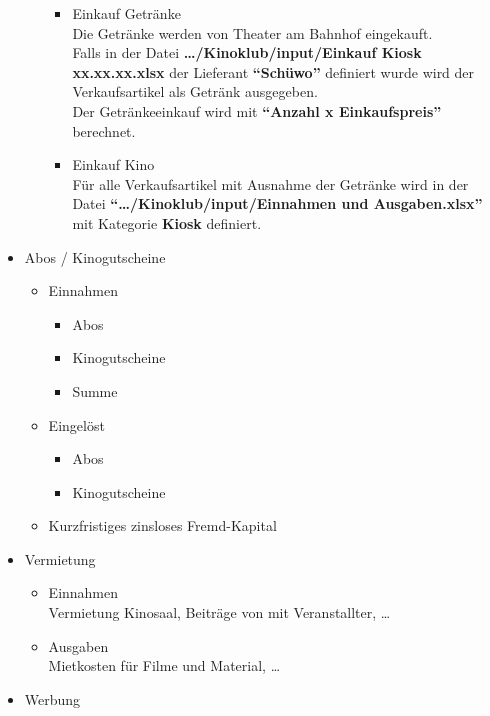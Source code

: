 \documentclass[
]{article}
\providecommand{\tightlist}{%
  \setlength{\itemsep}{0pt}\setlength{\parskip}{0pt}}
\begin{document}
\begin{itemize}
\begin{itemize}
    \begin{itemize}
    \tightlist
    \item
      Einkauf Getränke\\
      Die Getränke werden von Theater am Bahnhof eingekauft.\\
      Falls in der Datei \textbf{\ldots/Kinoklub/input/Einkauf Kiosk
      xx.xx.xx.xlsx} der Lieferant \textbf{``Schüwo''} definiert wurde
      wird der Verkaufsartikel als Getränk ausgegeben.\\
      Der Getränkeeinkauf wird mit \textbf{``Anzahl x Einkaufspreis''}
      berechnet.
    \item
      Einkauf Kino\\
      Für alle Verkaufsartikel mit Ausnahme der Getränke wird in der
      Datei \textbf{``\ldots/Kinoklub/input/Einnahmen und
      Ausgaben.xlsx''} ~ mit Kategorie \textbf{Kiosk} definiert.
    \end{itemize}
  \end{itemize}
\item
  Abos / Kinogutscheine

  \begin{itemize}
  \tightlist
  \item
    Einnahmen

    \begin{itemize}
    \tightlist
    \item
      Abos
    \item
      Kinogutscheine
    \item
      Summe
    \end{itemize}
  \item
    Eingelöst

    \begin{itemize}
    \tightlist
    \item
      Abos
    \item
      Kinogutscheine
    \end{itemize}
  \item
    Kurzfristiges zinsloses Fremd-Kapital
  \end{itemize}
\item
  Vermietung

  \begin{itemize}
  \tightlist
  \item
    Einnahmen\\
    Vermietung Kinosaal, Beiträge von mit Veranstallter, \ldots{}
  \item
    Ausgaben\\
    Mietkosten für Filme und Material, \ldots{}
  \end{itemize}
\item
  Werbung


\end{itemize}
\end{document}
